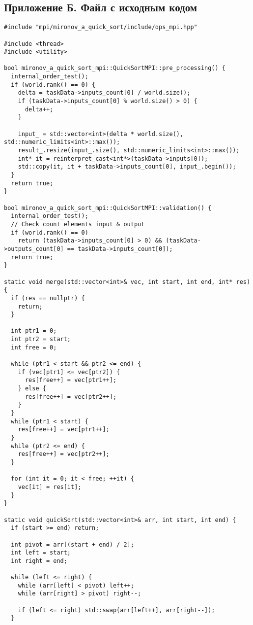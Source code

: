 \documentclass[12pt]{article}
\begin{document}
\subsection*{Приложение Б. Файл с исходным кодом}
\begin{lstlisting}
#include "mpi/mironov_a_quick_sort/include/ops_mpi.hpp"

#include <thread>
#include <utility>

bool mironov_a_quick_sort_mpi::QuickSortMPI::pre_processing() {
  internal_order_test();
  if (world.rank() == 0) {
    delta = taskData->inputs_count[0] / world.size();
    if (taskData->inputs_count[0] % world.size() > 0) {
      delta++;
    }

    input_ = std::vector<int>(delta * world.size(), std::numeric_limits<int>::max());
    result_.resize(input_.size(), std::numeric_limits<int>::max());
    int* it = reinterpret_cast<int*>(taskData->inputs[0]);
    std::copy(it, it + taskData->inputs_count[0], input_.begin());
  }
  return true;
}

bool mironov_a_quick_sort_mpi::QuickSortMPI::validation() {
  internal_order_test();
  // Check count elements input & output
  if (world.rank() == 0)
    return (taskData->inputs_count[0] > 0) && (taskData->outputs_count[0] == taskData->inputs_count[0]);
  return true;
}

static void merge(std::vector<int>& vec, int start, int end, int* res) {
  if (res == nullptr) {
    return;
  }

  int ptr1 = 0;
  int ptr2 = start;
  int free = 0;

  while (ptr1 < start && ptr2 <= end) {
    if (vec[ptr1] <= vec[ptr2]) {
      res[free++] = vec[ptr1++];
    } else {
      res[free++] = vec[ptr2++];
    }
  }
  while (ptr1 < start) {
    res[free++] = vec[ptr1++];
  }
  while (ptr2 <= end) {
    res[free++] = vec[ptr2++];
  }

  for (int it = 0; it < free; ++it) {
    vec[it] = res[it];
  }
}

static void quickSort(std::vector<int>& arr, int start, int end) {
  if (start >= end) return;

  int pivot = arr[(start + end) / 2];
  int left = start;
  int right = end;

  while (left <= right) {
    while (arr[left] < pivot) left++;
    while (arr[right] > pivot) right--;

    if (left <= right) std::swap(arr[left++], arr[right--]);
  }


\end{lstlisting}
\end{document}

